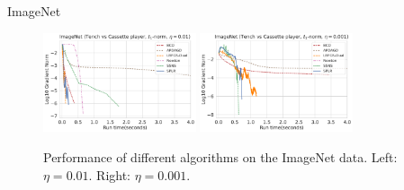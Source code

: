 \begin{frame}{ImageNet}
    \begin{figure}[ht]
      \centering
      \includegraphics[width=0.4\textwidth]{save/ImageNet/run_times/CLASS1=tench, CLASS2=cassette player, dim=30, norm=l1, reg=0.01}
      \includegraphics[width=0.4\textwidth]{save/ImageNet/run_times/CLASS1=tench, CLASS2=cassette player, dim=30, norm=l1, reg=0.001}
      \caption{Performance of different algorithms on the ImageNet data. Left: $\eta=0.01$. Right: $\eta=0.001$.}
      \label{fig:imagenet}
    \end{figure}
\end{frame}

